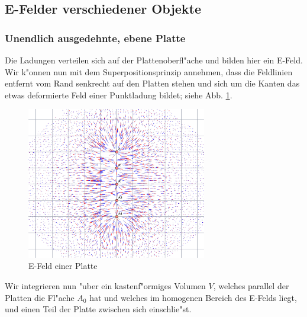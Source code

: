 \subsection{E-Felder verschiedener Objekte}
\label{kap_e-felder-verschiedener-objekte}




\subsubsection{Unendlich ausgedehnte, ebene Platte}
\label{kap_unendlich-ausgedehnte-ebene-platte}

Die Ladungen verteilen sich auf der Plattenoberfl"ache und bilden hier
ein E-Feld. Wir k"onnen nun mit dem
Superpositionsprinzip annehmen, dass die
Feldlinien entfernt vom Rand senkrecht auf den Platten stehen und sich
um die Kanten das etwas deformierte Feld einer Punktladung bildet;
siehe Abb. \ref{abb_E-feld-Platte}.

\begin{figure}[h]
   \centering
   \includegraphics[width=0.7\textwidth]{bilder/efeld_platte}
   \caption{E-Feld einer Platte}
   \label{abb_E-feld-Platte}
\end{figure}


Wir integrieren nun "uber ein kastenf"ormiges Volumen $V$, welches
parallel der Platten die Fl"ache $A_0$ hat und welches im homogenen
Bereich des E-Felds liegt, und einen Teil der Platte zwischen sich
einschlie"st.

